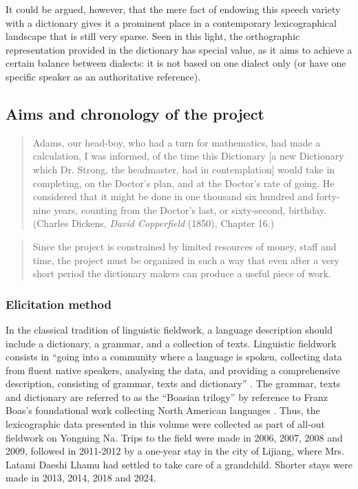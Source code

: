 It could be argued, however, that the mere fact of endowing this speech variety with a dictionary gives it a prominent place in a contemporary lexicographical landscape that is still very sparse. Seen in this light, the orthographic representation provided in the dictionary has special value, as it aims to achieve a certain balance between dialects: it is not based on one dialect only (or have one specific speaker as an authoritative reference).

\subsection{Aims and chronology of the project}

\begin{quotation}
    Adams, our head-boy, who had a turn for mathematics, had made a calculation, I was informed, of the time this Dictionary [a new Dictionary which Dr. Strong, the headmaster, had in contemplation] would take in completing, on the Doctor’s plan, and at the Doctor’s rate of going. He considered that it might be done in one thousand six hundred and forty-nine years, counting from the Doctor’s last, or sixty-second, birthday. (Charles Dickens, \emph{David Copperfield} (1850), Chapter 16.)
\end{quotation}

\begin{quotation}
    Since the project is constrained by limited resources of money, staff and time, the project must be organized in such a way that even after a very short period the dictionary makers can produce a useful piece of work. \parencite[``Dictionary making in endangered speech communities'':][42]{mosel_dictionary_2004}
\end{quotation}

\subsubsection{Elicitation method}

In the classical tradition of linguistic fieldwork, a language description should include a dictionary, a grammar, and a collection of texts. Linguistic fieldwork consists in “going into a community where a language is spoken, collecting data from fluent native speakers, analysing the data, and providing a comprehensive description, consisting of grammar, texts and dictionary” \parencite[12]{dixon2007}. The grammar, texts and dictionary are referred to as the “Boasian trilogy” \parencite{foley1999} by reference to Franz Boas’s foundational work collecting North American languages \parencite{boas1902,boasetal1911}. Thus, the lexicographic data presented in this volume were collected as part of all-out fieldwork on Yongning Na. Trips to the field were made in 2006, 2007, 2008 and 2009, followed in 2011-2012 by a one-year stay in the city of Lijiang, where Mrs. Latami Daeshi Lhamu had settled to take care of a grandchild. Shorter stays were made in 2013, 2014, 2018 and 2024.


